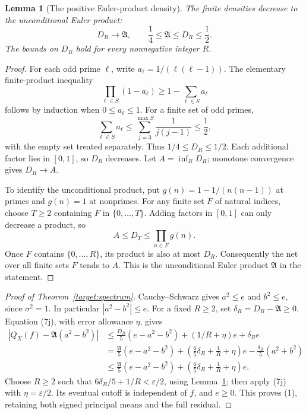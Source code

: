 \documentclass[11pt]{article}
\newtheorem{lemma}{Lemma}
\newcommand{\Aconst}{\mathfrak A}
\begin{document}
\begin{lemma}[The positive Euler-product density]\label{lem:artin}
The finite densities decrease to the unconditional Euler product:
\[
 D_R\longrightarrow\Aconst,\qquad
 \frac14\le\Aconst\le D_R\le\frac12 .
\]
The bounds on \(D_R\) hold for every nonnegative integer \(R\).
\end{lemma}
\begin{proof}
For each odd prime \(\ell\), write \(a_\ell=1/(\ell(\ell-1))\).
The elementary finite-product inequality
\[
 \prod_{\ell\in S}(1-a_\ell)\ge1-\sum_{\ell\in S}a_\ell
\]
follows by induction when \(0\le a_\ell\le1\).
For a finite set of odd primes,
\[
 \sum_{\ell\in S}a_\ell\le
 \sum_{j=3}^{\max S}\frac1{j(j-1)}\le\frac12 ,
\]
with the empty set treated separately.
Thus \(1/4\le D_R\le1/2\).
Each additional factor lies in \([0,1]\), so \(D_R\) decreases.
Let \(A=\inf_R D_R\); monotone convergence gives \(D_R\to A\).

To identify the unconditional product, put
\(g(n)=1-1/(n(n-1))\) at primes and \(g(n)=1\) at nonprimes.
For any finite set \(F\) of natural indices, choose \(T\ge2\)
containing \(F\) in \(\{0,\ldots,T\}\).
Adding factors in \([0,1]\) can only decrease a product, so
\[
 A\le D_T\le\prod_{n\in F}g(n).
\]
Once \(F\) contains \(\{0,\ldots,R\}\), its product is also at most \(D_R\).
Consequently the net over all finite sets \(F\) tends to \(A\).
This is the unconditional Euler product \(\Aconst\) in the statement.
\end{proof}

\begin{proof}[Proof of Theorem~\ref{target:spectrum}]
Cauchy--Schwarz gives \(a^2\le e\) and \(b^2\le e\), since
\(\sigma^2=1\). In particular \(|a^2-b^2|\le e\).
For a fixed \(R\ge2\), set \(\delta_R=D_R-\Aconst\ge0\).
Equation (7j), with error allowance \(\eta\), gives
\begin{align*}
 |Q_X(f)-\Aconst(a^2-b^2)|
 &\le \frac{D_R}{5}(e-a^2-b^2)
       +(1/R+\eta)e+\delta_R e\\
 &=\frac{\Aconst}{5}(e-a^2-b^2)
   +\left(\frac65\delta_R+\frac1R+\eta\right)e
   -\frac{\delta_R}{5}(a^2+b^2)\\
 &\le\frac{\Aconst}{5}(e-a^2-b^2)
   +\left(\frac65\delta_R+\frac1R+\eta\right)e .
\end{align*}
Choose \(R\ge2\) such that \(6\delta_R/5+1/R<\varepsilon/2\),
using Lemma~\ref{lem:artin}; then apply (7j) with \(\eta=\varepsilon/2\).
Its eventual cutoff is independent of \(f\), and \(e\ge0\).
This proves (1), retaining both signed principal means and the full residual.
\end{proof}
\end{document}
